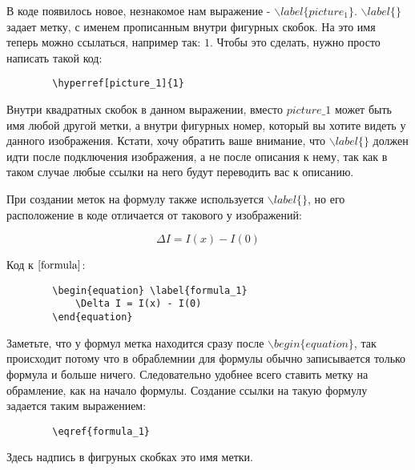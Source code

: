     В коде появилось новое, незнакомое нам выражение - $\backslash label\{picture_1\}$. $\backslash label\{\}$ задает метку, с именем прописанным внутри фигурных скобок. На это имя теперь можно ссылаться, например так: $\hyperref[picture]{1}$. Чтобы это сделать, нужно просто написать такой код:
    
    \begin{verbatim}
        \hyperref[picture_1]{1}
    \end{verbatim}
    
    Внутри квадратных скобок в данном выражении, вместо $picture\_1$ может быть имя любой другой метки, а внутри фигурных номер, который вы хотите видеть у данного изображения. Кстати, хочу обратить ваше внимание, что $\backslash label\{\}$ должен идти после подключения изображения, а не после описания к нему, так как в таком случае любые ссылки на него будут переводить вас к описанию.
    
    При создании меток на формулу также используется $\backslash label\{\}$, но его расположение в коде отличается от такового у изображений:
    
    \begin{equation} \label{formula}
        \Delta I = I(x) - I(0)
    \end{equation}
    
    Код к $\eqref{formula}$:
    
    \newpage
    
    \begin{verbatim}
        \begin{equation} \label{formula_1}
            \Delta I = I(x) - I(0)
        \end{equation}
    \end{verbatim}
    
    Заметьте, что у формул метка находится сразу после $\backslash begin\{equation\}$, так происходит потому что в обраблемнии для формулы обычно записывается только формула и больше ничего. Следовательно удобнее всего ставить метку на обрамление, как на начало формулы. Создание ссылки на такую формулу задается таким выражением:
    
    \begin{verbatim}
        \eqref{formula_1}
    \end{verbatim}
    
    Здесь надпись в фигруных скобках это имя метки.
    
